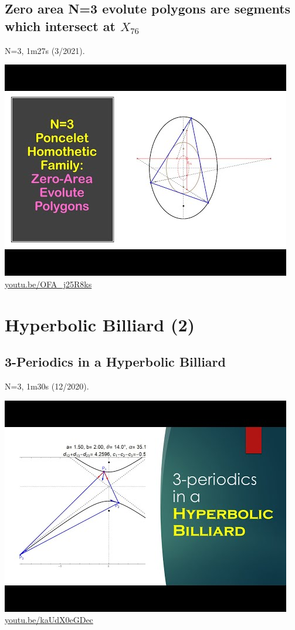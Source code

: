 \documentclass[12pt]{amsart}
\begin{document}
\subsection{Zero area N=3 evolute polygons are segments which intersect at $X_{76}$}
\label{vid:OFA_j25R8ks}
\noindent N=3, 1m27s (3/2021). 
\begin{center}\includegraphics[width=.5\textwidth]{pics/OFA_j25R8ks.jpg} \\ 
\href{https://youtu.be/OFA_j25R8ks}{\url{youtu.be/OFA\_j25R8ks}}\end{center}
% 


\section{Hyperbolic Billiard (2)}

\subsection{3-Periodics in a Hyperbolic Billiard}
\label{vid:kaUdX0eGDec}
\noindent N=3, 1m30s (12/2020). 
\begin{center}\includegraphics[width=.5\textwidth]{pics/kaUdX0eGDec.jpg} \\ 
\href{https://youtu.be/kaUdX0eGDec}{\url{youtu.be/kaUdX0eGDec}}\end{center}
% 
\end{document}
